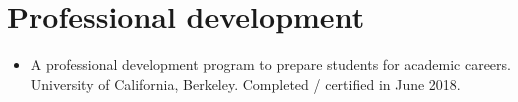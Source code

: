 \documentclass[letterpaper]{deedy-resume} %
\begin{document}
{%




  





  
  



\vspace{0.2cm}
\section{Professional development}
\vspace{0.2cm}

\begin{itemize}

\item {} A professional development program to prepare students for academic careers. University of California, Berkeley. Completed / certified in June 2018.
  

\end{itemize}}
\end{document}
